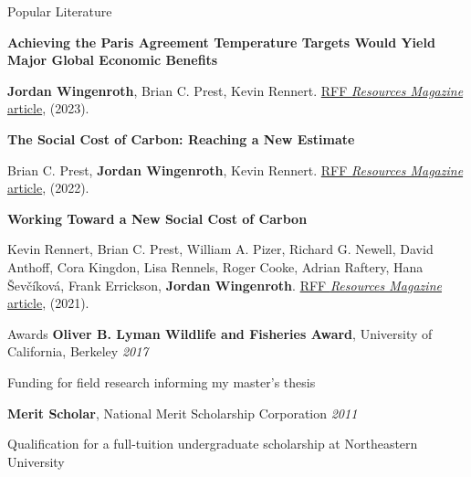 \documentclass{resume} %
\begin{document}
\begin{rSection}{Popular Literature}

{\bf Achieving the Paris Agreement Temperature Targets Would Yield Major Global Economic Benefits}
\vspace{-7pt}
\begin{adjustwidth}{12pt}{}
{\small \textbf{Jordan Wingenroth}, Brian C. Prest, Kevin Rennert. \href{https://www.resources.org/common-resources/achieving-the-paris-agreement-temperature-targets-would-yield-major-global-economic-benefits/}{RFF \textit{Resources Magazine} article}, (2023).}
\end{adjustwidth}

{\bf The Social Cost of Carbon: Reaching a New Estimate}
\vspace{-7pt}
\begin{adjustwidth}{12pt}{}
{\small Brian C. Prest, \textbf{Jordan Wingenroth}, Kevin Rennert. \href{https://www.resources.org/archives/the-social-cost-of-carbon-reaching-a-new-estimate/}{RFF \textit{Resources Magazine} article}, (2022).}
\end{adjustwidth}

{\bf Working Toward a New Social Cost of Carbon}
\vspace{-7pt}
\begin{adjustwidth}{12pt}{}
{\small Kevin Rennert, Brian C. Prest, William A. Pizer, Richard G. Newell, David Anthoff, Cora Kingdon, Lisa Rennels, Roger Cooke, Adrian Raftery, Hana \v{S}ev\v{c}\'{i}kov\'{a}, Frank Errickson, \textbf{Jordan Wingenroth}. \href{https://www.resources.org/archives/working-toward-a-new-social-cost-of-carbon/}{RFF \textit{Resources Magazine} article}, (2021).}
\end{adjustwidth}

\end{rSection}


\begin{rSection}{Awards} 
{\bf Oliver B. Lyman Wildlife and Fisheries Award}{, University of California, Berkeley
} \hfill{\em 2017}
\vspace{-7pt}
\begin{adjustwidth}{12pt}{}
{\small Funding for field research informing my master's thesis}
\end{adjustwidth}
{\bf Merit Scholar}{, National Merit Scholarship Corporation
} \hfill{\em 2011}
\vspace{-7pt}
\begin{adjustwidth}{12pt}{}
{\small Qualification for a full-tuition undergraduate scholarship at Northeastern University}
\end{adjustwidth}

\end{rSection}
\end{document}
